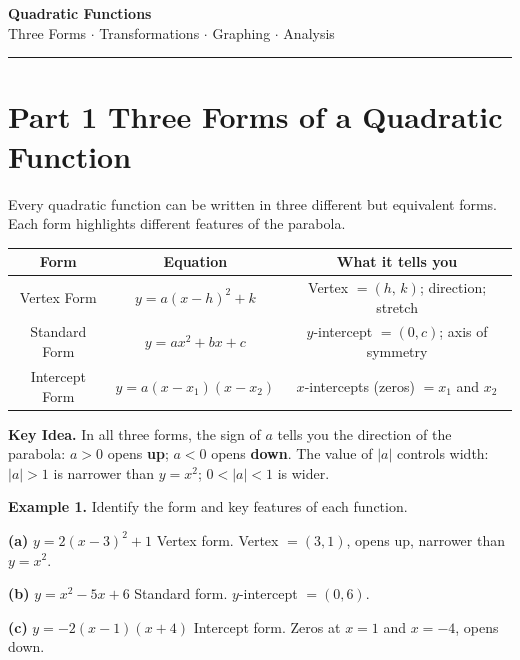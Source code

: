 \documentclass[11pt]{article}
\newcommand{\KeyIdea}[1]{\begin{keybox}\textbf{Key Idea.} #1\end{keybox}}
\begin{document}
\begin{center}
  {\Large\textbf{Quadratic Functions}}\\[4pt]
  {\large Three Forms $\cdot$ Transformations $\cdot$ Graphing $\cdot$ Analysis}
\end{center}
\hrule
\vspace{0.4cm}

\section*{Part 1 \quad Three Forms of a Quadratic Function}

Every quadratic function can be written in three different but equivalent forms.
Each form highlights different features of the parabola.

\vspace{0.3cm}
\begin{center}
\renewcommand{\arraystretch}{2}
\begin{tabular}{|c|c|c|}
\hline
\textbf{Form} & \textbf{Equation} & \textbf{What it tells you} \\
\hline
Vertex Form   & $y = a(x - h)^2 + k$ & Vertex $= (h,\, k)$; direction; stretch \\
\hline
Standard Form & $y = ax^2 + bx + c$  & $y$-intercept $= (0,c)$; axis of symmetry \\
\hline
Intercept Form & $y = a(x - x_1)(x - x_2)$ & $x$-intercepts (zeros) $= x_1$ and $x_2$ \\
\hline
\end{tabular}
\end{center}

\vspace{0.3cm}
\KeyIdea{In all three forms, the sign of $a$ tells you the direction of the
parabola: $a > 0$ opens \textbf{up}; $a < 0$ opens \textbf{down}.
The value of $|a|$ controls width: $|a|>1$ is narrower than $y=x^2$;
$0 < |a| < 1$ is wider.}

\vspace{0.3cm}
\begin{exbox}
\textbf{Example 1.} Identify the form and key features of each function.

\textbf{(a)} $y = 2(x-3)^2 + 1$ \quad Vertex form. \quad Vertex $= (3,1)$, opens up, narrower than $y=x^2$.

\textbf{(b)} $y = x^2 - 5x + 6$ \quad Standard form. \quad $y$-intercept $= (0,6)$.

\textbf{(c)} $y = -2(x-1)(x+4)$ \quad Intercept form. \quad Zeros at $x=1$ and $x=-4$, opens down.
\end{exbox}
\end{document}
